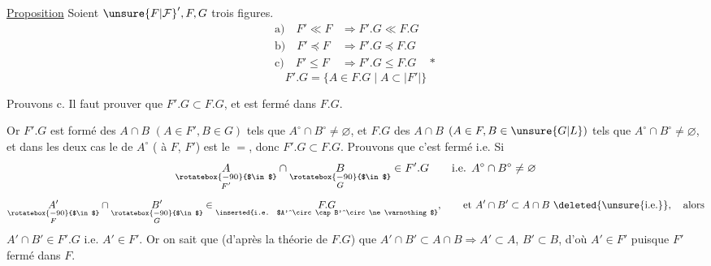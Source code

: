 \uline{Proposition} Soient ${\unsure{F|\mathcal F}}',F,G$ trois figures.
\[
\begin{aligned}
 \text{a)}\quad F'\ll F&\Longrightarrow F'.G\ll F.G\\
 \text{b)}\quad F'\preceq F&\Longrightarrow F'.G\preceq F.G\\
 \text{c)}\quad F'\leq F&\Longrightarrow F'.G\leq F.G\quad *
\end{aligned}
\]
\[
 F'.G=\{A\in F.G\mid A\subset |F'|\}
\]

Prouvons c. Il faut prouver que  $F'.G\subset F.G$, et est fermé dans $F.G$.

 Or $F'.G$ est formé des $A\cap B$ $(A\in F',B\in G)$ tels que $A^\circ\cap B^\circ\ne\varnothing$, et $F.G$ des $A\cap B$ $(A\in F,B\in \unsure{G|L})$ tels que $A^\circ\cap B^\circ\ne\varnothing$, et dans les deux cas le  de $A^\circ$ ( à $F$,  $F'$) est le $=$, donc $F'.G\subset F.G$. Prouvons que c'est fermé i.e.
Si 
\[
 \underset{\substack{\rotatebox{-90}{$\in$}\\ F'}}{A}\cap
 \underset{\substack{\rotatebox{-90}{$\in$}\\ G}}{B}\in F'.G\qquad
 \text{i.e. } A^\circ\cap B^\circ\ne\varnothing
\]
\[
 \underset{\substack{\rotatebox{-90}{$\in$}\\ F}}{A'}\cap
 \underset{\substack{\rotatebox{-90}{$\in$}\\ G}}{B'}\in\underset{\text{\inserted{i.e. $A'^\circ\cap B'^\circ\ne\varnothing$}}}{F.G},\qquad
 \text{et } A'\cap B'\subset A\cap B\ \deleted{\unsure{\text{i.e.}}},\quad\text{alors}
\]
$A'\cap B'\in F'.G$ i.e. $A'\in F'$. Or on sait que (d'après la théorie de $F.G$) que $A'\cap B'\subset A\cap B\Longrightarrow A'\subset A$, $B'\subset B$, d'où $A'\in F'$ puisque $F'$ fermé dans $F$.

